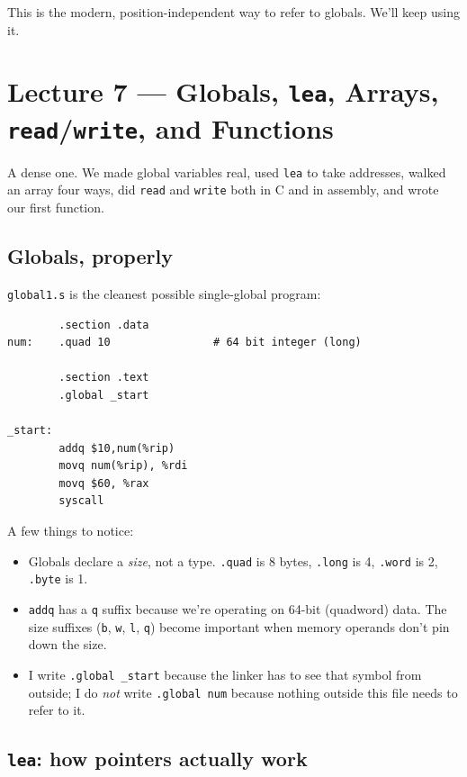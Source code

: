 \documentclass[11pt]{article}
\begin{document}
This is the modern, position-independent way to refer to globals.
We'll keep using it.

\section{Lecture 7 --- Globals, \texttt{lea}, Arrays, \texttt{read}/\texttt{write}, and Functions}

A dense one. We made global variables real, used \texttt{lea} to
take addresses, walked an array four ways, did \texttt{read} and
\texttt{write} both in C and in assembly, and wrote our first
function.

\subsection*{Globals, properly}

\texttt{global1.s} is the cleanest possible single-global program:

\begin{lstlisting}
        .section .data
num:    .quad 10                # 64 bit integer (long)

        .section .text
        .global _start

_start:
        addq $10,num(%rip)
        movq num(%rip), %rdi
        movq $60, %rax
        syscall
\end{lstlisting}

A few things to notice:
\begin{itemize}
  \item Globals declare a \emph{size}, not a type. \texttt{.quad} is
    8 bytes, \texttt{.long} is 4, \texttt{.word} is 2,
    \texttt{.byte} is 1.
  \item \texttt{addq} has a \texttt{q} suffix because we're
    operating on 64-bit (quadword) data. The size suffixes
    (\texttt{b}, \texttt{w}, \texttt{l}, \texttt{q}) become
    important when memory operands don't pin down the size.
  \item I write \texttt{.global \_start} because the linker has to
    see that symbol from outside; I do \emph{not} write
    \texttt{.global num} because nothing outside this file needs
    to refer to it.
\end{itemize}

\subsection*{\texttt{lea}: how pointers actually work}
\end{document}
